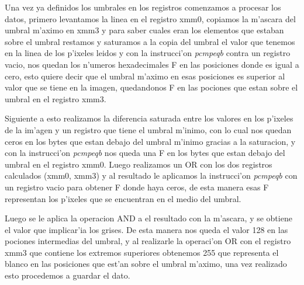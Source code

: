 Una vez ya definidos los umbrales en los registros comenzamos a procesar los datos, primero levantamos la linea 
en el registro xmm0, copiamos la m'ascara del umbral m'aximo en xmm3 y para saber cuales eran los elementos que estaban
sobre el umbral restamos y saturamos a la copia del umbral el valor que tenemos en la linea de los p'ixeles leidos y con 
la instrucci'on \textit{pcmpeqb} contra un registro vacio, nos quedan los n'umeros hexadecimales F en las posiciones donde es igual a cero, 
esto quiere decir que el umbral m'aximo en esas posiciones es superior al valor que se tiene en la imagen, quedandonos F 
en las pociones que estan sobre el umbral en el registro xmm3.

Siguiente a esto realizamos la diferencia saturada entre los valores en los p'ixeles de la im'agen y un registro que tiene 
el umbral m'inimo, con lo cual nos quedan ceros en los bytes que estan debajo del umbral m'inimo gracias a la saturacion,
y con la instrucci'on \textit{pcmpeqb} nos queda una F en los bytes que estan debajo del umbral en el registro xmm0.
Luego realizamos un OR con los dos registros calculados (xmm0, xmm3) y al resultado le aplicamos la instrucci'on \textit{pcmpeqb} con
un registro vacio para obtener F donde haya ceros, de esta manera esas F representan los p'ixeles que se encuentran en el 
medio del umbral.

Luego se le aplica la operacion AND a el resultado con la m'ascara, y se obtiene el valor que implicar'ia los grises.
De esta manera nos queda el valor 128 en las pociones intermedias del umbral, y al realizarle la operaci'on OR con el registro 
xmm3 que contiene los extremos superiores obtenemos 255 que representa el blanco en las posiciones que est'an sobre el umbral 
m'aximo, una vez realizado esto procedemos a guardar el dato.